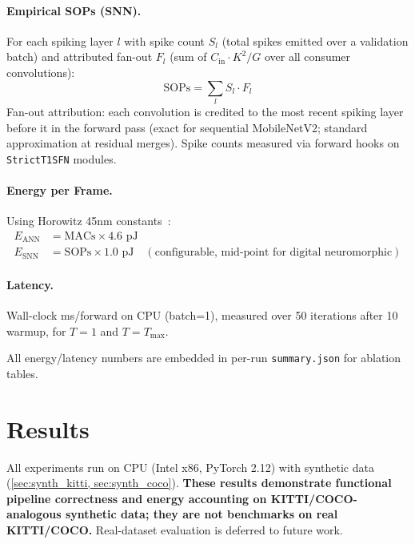 \documentclass[10pt,conference]{IEEEtran}
\begin{document}
\paragraph{Empirical SOPs (SNN).} For each spiking layer $l$ with spike count $S_l$ (total spikes emitted over a validation batch) and attributed fan-out $F_l$ (sum of $C_{\text{in}} \cdot K^2 / G$ over all consumer convolutions):
\begin{equation}
    \text{SOPs} = \sum_l S_l \cdot F_l
\end{equation}
Fan-out attribution: each convolution is credited to the most recent spiking layer before it in the forward pass (exact for sequential MobileNetV2; standard approximation at residual merges). Spike counts measured via forward hooks on \texttt{StrictT1SFN} modules.

\paragraph{Energy per Frame.} Using Horowitz 45nm constants~\cite{horowitz2014computing}:
\begin{align}
    E_{\text{ANN}} &= \text{MACs} \times 4.6 \text{ pJ} \\
    E_{\text{SNN}} &= \text{SOPs} \times 1.0 \text{ pJ} \quad (\text{configurable, mid-point for digital neuromorphic})
\end{align}

\paragraph{Latency.} Wall-clock ms/forward on CPU (batch=1), measured over 50 iterations after 10 warmup, for $T=1$ and $T=T_{\text{max}}$.

All energy/latency numbers are embedded in per-run \texttt{summary.json} for ablation tables.


\section{Results}
\label{sec:results}

All experiments run on CPU (Intel x86, PyTorch 2.12) with synthetic data (\cref{sec:synth_kitti, sec:synth_coco}). \textbf{These results demonstrate functional pipeline correctness and energy accounting on KITTI/COCO-analogous synthetic data; they are not benchmarks on real KITTI/COCO.} Real-dataset evaluation is deferred to future work.
\end{document}
